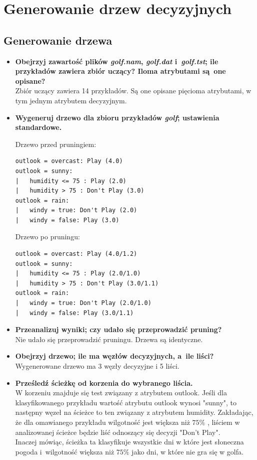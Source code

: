 
\section{Generowanie drzew decyzyjnych}

\subsection{Generowanie drzewa}

\begin{itemize}
\item \textbf{Obejrzyj zawartość plików \emph{golf.nam}, \emph{golf.dat} i~\emph{golf.tst}; ile przykładów zawiera zbiór uczący? Iloma atrybutami są~one opisane?}
	\\Zbiór uczący zawiera 14 przykładów. Są one opisane pięcioma atrybutami, w tym jednym atrybutem decyzyjnym.

\item \textbf{Wygeneruj drzewo dla zbioru przykładów \emph{golf}; ustawienia standardowe.}

Drzewo przed pruningiem:	 
	\begin{verbatim}
outlook = overcast: Play (4.0)
outlook = sunny:
|   humidity <= 75 : Play (2.0)
|   humidity > 75 : Don't Play (3.0)
outlook = rain:
|   windy = true: Don't Play (2.0)
|   windy = false: Play (3.0)
	\end{verbatim}
	
Drzewo po pruningu:
	\begin{verbatim}
outlook = overcast: Play (4.0/1.2)
outlook = sunny:
|   humidity <= 75 : Play (2.0/1.0)
|   humidity > 75 : Don't Play (3.0/1.1)
outlook = rain:
|   windy = true: Don't Play (2.0/1.0)
|   windy = false: Play (3.0/1.1)
	\end{verbatim}





\item \textbf{Przeanalizuj wyniki; czy udało się przeprowadzić pruning?}
	\\Nie udało się przeprowadzić pruningu. Drzewa są identyczne.

\item \textbf{Obejrzyj drzewo; ile ma węzłów decyzyjnych, a~ile liści?}
	\\Wygenerowane drzewo ma 3 węzły decyzyjne i 5 liści.

\item \textbf{ Prześledź ścieżkę od korzenia do wybranego liścia.}
		\\W korzeniu znajduje się test związany z atrybutem outlook. Jeśli dla klasyfikowanego przykładu wartość atrybutu outlook wynosi "sunny", to następny węzeł na ścieżce to ten związany z atrybutem humidity. Zakładając, że dla omawianego przykładu wilgotność jest większa niż $ 75\% $ , liściem w analizowanej ścieżce będzie liść odnoszący się decyzji "Don't Play".
		\\Inaczej mówiąc, ścieżka ta klasyfikuje wszystkie dni w które jest słoneczna pogoda i~wilgotność większa niż $ 75\% $ jako dni, w które nie gra się w golfa.
		

\end{itemize}
